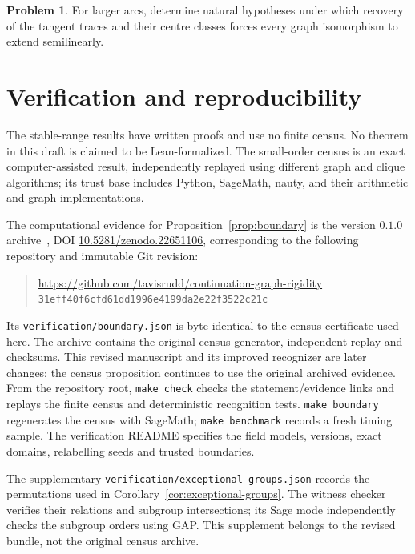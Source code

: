 \documentclass[11pt]{article}
\theoremstyle{definition}
\newtheorem{problem}[theorem]{Problem}
\theoremstyle{remark}
\begin{document}
\begin{problem}\label{prob:larger-arcs}
For larger arcs, determine natural hypotheses under which recovery of the
tangent traces and their centre classes forces every graph isomorphism to
extend semilinearly.
\end{problem}


\appendix
\section{Verification and reproducibility}\label{sec:verification}

The stable-range results have written proofs and use no finite census.
No theorem in this draft is claimed to be Lean-formalized. The small-order
census is an exact computer-assisted result, independently replayed using
different graph and clique algorithms; its trust base includes Python,
SageMath, nauty, and their arithmetic and graph implementations.

The computational evidence for Proposition~\ref{prop:boundary} is the
version $0.1.0$ archive~\cite{CensusArtifact}, DOI
\href{https://doi.org/10.5281/zenodo.22651106}{10.5281/zenodo.22651106},
corresponding to the following repository and immutable Git revision:
\begin{quote}\small
\url{https://github.com/tavisrudd/continuation-graph-rigidity}\\
\texttt{31eff40f6cfd61dd1996e4199da2e22f3522c21c}
\end{quote}
Its \texttt{verification/boundary.json} is byte-identical to the census
certificate used here. The archive contains the original census generator,
independent replay and checksums. This revised manuscript and its improved
recognizer are later changes; the census proposition continues to use the
original archived evidence. From the repository root,
\texttt{make check} checks the statement/evidence links and replays the
finite census and deterministic recognition tests. \texttt{make boundary}
regenerates the census with SageMath; \texttt{make benchmark} records a
fresh timing sample. The verification README specifies the field models,
versions, exact domains, relabelling seeds and trusted boundaries.

The supplementary \texttt{verification/exceptional-groups.json} records
the permutations used in Corollary~\ref{cor:exceptional-groups}.
The witness checker verifies their relations and subgroup intersections;
its Sage mode independently checks the subgroup orders using GAP.
This supplement belongs to the revised bundle, not the original census archive.
\end{document}

